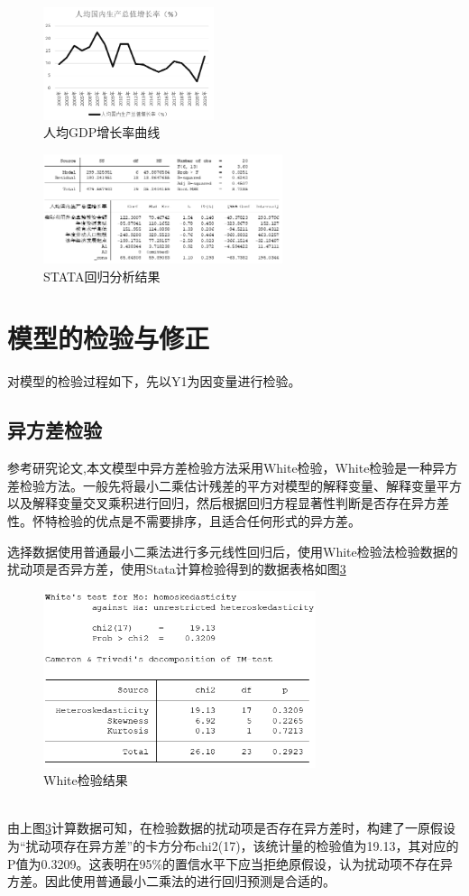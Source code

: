 \documentclass[UTF8]{article}
\begin{document}
	\begin{figure}[htb]
	\centering
	\includegraphics[width=5cm]{pictures/rjgdp1.png}
	\caption{人均GDP增长率曲线}
	\label{rjgdp1}
	\end{figure}
	\begin{figure}[htb]
	\centering
	\includegraphics[width=7cm]{pictures/nhjg5.png}
	\caption{STATA回归分析结果}
	\label{nhjg5}
	\end{figure}
	\section{模型的检验与修正}
	对模型的检验过程如下，先以Y1为因变量进行检验。
	\subsection{异方差检验}
	参考研究论文\cite{white},本文模型中异方差检验方法采用White检验，White检验是一种异方差检验方法。一般先将最小二乘估计残差的平方对模型的解释变量、解释变量平方以及解释变量交叉乘积进行回归，然后根据回归方程显著性判断是否存在异方差性。怀特检验的优点是不需要排序，且适合任何形式的异方差。
	
	选择数据使用普通最小二乘法进行多元线性回归后，使用White检验法检验数据的扰动项是否异方差，使用Stata计算检验得到的数据表格如图\ref{yfcjy1}
	\begin{figure}[htb]
	\centering
	\includegraphics[width=8cm]{pictures/yfcjy1.png}
	\caption{White检验结果}
	\label{yfcjy1}
	\end{figure}
	\\由上图\ref{yfcjy1}计算数据可知，在检验数据的扰动项是否存在异方差时，构建了一原假设为“扰动项存在异方差”的卡方分布chi2(17)，该统计量的检验值为19.13，其对应的P值为0.3209。这表明在95\%的置信水平下应当拒绝原假设，认为扰动项不存在异方差。因此使用普通最小二乘法的进行回归预测是合适的。
\end{document}
